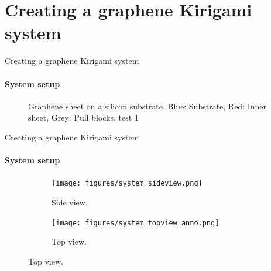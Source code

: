 \documentclass[
	10pt, %
]{beamer}
\begin{document}
\section{Creating a graphene Kirigami system} %
\begin{frame}{Creating a graphene Kirigami system}
\framesubtitle{System setup}




\begin{figure}
	\centering    
	\caption{Graphene sheet on a silicon substrate. Blue: Substrate, Red: Inner sheet, Grey: Pull blocks. test 1}
\end{figure} 
	
\end{frame}




\begin{frame}{Creating a graphene Kirigami system}
\framesubtitle{System setup}

\begin{figure}[H]
	\centering
	\begin{subfigure}[b]{0.5\textwidth}
		\centering
		\texttt{[image: figures/system\_sideview.png]}
		\caption{Side view.}
	\end{subfigure}
	\begin{subfigure}[b]{0.5\textwidth}
		\centering
		\texttt{[image: figures/system\_topview\_anno.png]}
		\caption{Top view.}
	\end{subfigure}
  \end{figure}
  



\end{frame}
\end{document}
